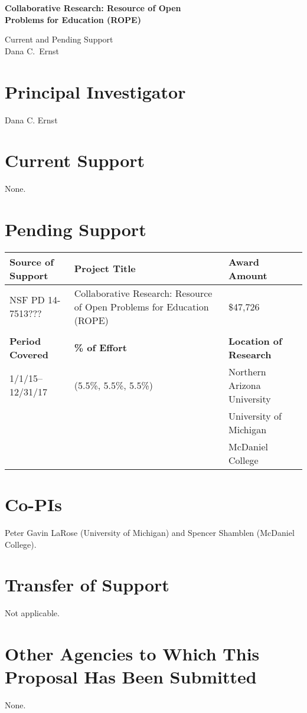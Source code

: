 \documentclass[11pt]{article}
\begin{document}
\begin{center}
{\Large \textbf{Collaborative Research: Resource of Open\\
Problems for Education (ROPE)}}

\bigskip

{\Large Current and Pending Support}\\
\smallskip
Dana C.~Ernst
\end{center}

\thispagestyle{empty}

\section{Principal Investigator}

\noindent Dana C. Ernst

\section{Current Support}

\noindent None.

\section{Pending Support}

\begin{tabularx}{6.4in}{@{}lXl}
\hline
\textbf{Source of Support} & \textbf{Project Title} & \textbf{Award Amount} \\
\hline
NSF PD 14-7513??? & Collaborative Research: Resource of Open Problems for Education (ROPE) & \$47,726\\
\\
\hline
\textbf{Period Covered} & \textbf{\% of Effort} & \textbf{Location of Research} \\
\hline
1/1/15--12/31/17 \ \ & (5.5\%, 5.5\%, 5.5\%) \ & Northern Arizona University \\ 
&& University of Michigan \\
&& McDaniel College\\
\end{tabularx}

\section{Co-PIs}

\noindent Peter Gavin LaRose (University of Michigan) and Spencer Shamblen (McDaniel College).

\section{Transfer of Support}

\noindent Not applicable.

\section{Other Agencies to Which This Proposal Has Been Submitted}

None.
\end{document}
